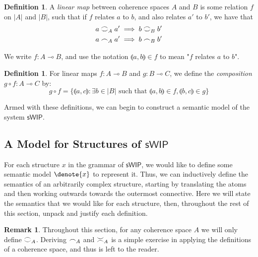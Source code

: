 \documentclass[12pt, oneside]{article}
\theoremstyle{plain}
\theoremstyle{definition}
\newtheorem{definition}[theorem]{Definition}
\newtheorem*{remark}{Remark}
\DeclarePairedDelimiter\denote\llbracket\rrbracket
\newcommand{\lp}{\llparenthesis}
\newcommand{\rp}{\rrparenthesis}
\newcommand{\sSys}{{\mathsf{sWIP}}}%
\newcommand{\coh}[1][]{\mathrel{\vcenter{\offinterlineskip\hbox{$\frown$}\vskip0.2ex\hbox{$\smile$}}_{\ifx\\#1\\\else#1\fi}}}
\newcommand{\incoh}[1][]{\mathrel{\vcenter{\offinterlineskip\hbox{$\smile$}\vskip0.2ex\hbox{$\frown$}}_{\ifx\\#1\\\else#1\fi}}}
\newcommand{\scoh}[1][]{\mathrel{\frown}_{\ifx\\#1\\\else#1\fi}}
\newcommand{\comp}{\mathbin{\circ}}
\begin{document}
\begin{definition}
    A \textit{linear map} between coherence spaces $A$ and $B$ is some relation $f$ on $|A|$ and $|B|$,
    such that if $f$ relates $a$ to $b$, and also relates $a'$ to $b'$, we have that
    \begin{align*}
        a \coh[A] a' &\implies b \coh[B] b' \\
        a \scoh[A] a' &\implies b \scoh[B] b'
    \end{align*}

    We write $f:A\multimap B$, and use the notation $\lp a,b\rp\in f$ to mean "$f$ relates $a$ to $b$".
\end{definition}

\begin{definition}
    For linear maps $f:A\multimap B$ and $g:B\multimap C$, we define the \textit{composition} $g\comp f:A\multimap C$ by:
    $$g\comp f = \{\lp a,c\rp:\exists b\in|B|\text{ such that }\lp a,b\rp\in f, \lp b,c\rp\in g\}$$
\end{definition}

Armed with these definitions, we can begin to construct a semantic model of the system $\sSys$.

\subsection{A Model for Structures of $\sSys$}

For each structure $x$ in the grammar of $\sSys$, we would like to define some semantic model $\denote{x}$ to represent it.
Thus, we can inductively define the semantics of an arbitrarily complex structure, starting by translating the atoms and then working outwards towards the outermost connective.
Here we will state the semantics that we would like for each structure, then, throughout the rest of this section, unpack and justify each definition.

\begin{remark}
    Throughout this section, for any coherence space $A$ we will only define $\coh[A]$.
    Deriving $\scoh[A]$ and $\incoh[A]$ is a simple exercise in applying the definitions of a coherence space, and thus is left to the reader.
\end{remark}
\end{document}

